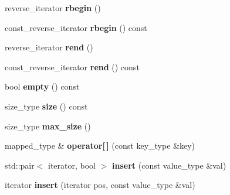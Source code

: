 \begin{DoxyCompactItemize}
\item 
\hypertarget{classLoki_1_1AssocVector_a88d59f808d500e505faa0fa7783ad69c}{}reverse\+\_\+iterator {\bfseries rbegin} ()\label{classLoki_1_1AssocVector_a88d59f808d500e505faa0fa7783ad69c}

\item 
\hypertarget{classLoki_1_1AssocVector_aa6fa6f8f8e9ccd042d1fef601029f252}{}const\+\_\+reverse\+\_\+iterator {\bfseries rbegin} () const \label{classLoki_1_1AssocVector_aa6fa6f8f8e9ccd042d1fef601029f252}

\item 
\hypertarget{classLoki_1_1AssocVector_a06a96998168c4774c80892ac28b3cf21}{}reverse\+\_\+iterator {\bfseries rend} ()\label{classLoki_1_1AssocVector_a06a96998168c4774c80892ac28b3cf21}

\item 
\hypertarget{classLoki_1_1AssocVector_a46222aaabc6de5041da1dbf07a40c3c0}{}const\+\_\+reverse\+\_\+iterator {\bfseries rend} () const \label{classLoki_1_1AssocVector_a46222aaabc6de5041da1dbf07a40c3c0}

\item 
\hypertarget{classLoki_1_1AssocVector_a7aff90b990beaff77a147eb2172f6290}{}bool {\bfseries empty} () const \label{classLoki_1_1AssocVector_a7aff90b990beaff77a147eb2172f6290}

\item 
\hypertarget{classLoki_1_1AssocVector_af2e4bd14f695360ba5afc01f64a5ce6b}{}size\+\_\+type {\bfseries size} () const \label{classLoki_1_1AssocVector_af2e4bd14f695360ba5afc01f64a5ce6b}

\item 
\hypertarget{classLoki_1_1AssocVector_aa349b331fdc3b1b1157820f880f8ca09}{}size\+\_\+type {\bfseries max\+\_\+size} ()\label{classLoki_1_1AssocVector_aa349b331fdc3b1b1157820f880f8ca09}

\item 
\hypertarget{classLoki_1_1AssocVector_ae69c5aad6d99d023dc31110b03b6bc89}{}mapped\+\_\+type \& {\bfseries operator\mbox{[}$\,$\mbox{]}} (const key\+\_\+type \&key)\label{classLoki_1_1AssocVector_ae69c5aad6d99d023dc31110b03b6bc89}

\item 
\hypertarget{classLoki_1_1AssocVector_aa1a55359c5376e49232febaace080aba}{}std\+::pair$<$ iterator, bool $>$ {\bfseries insert} (const value\+\_\+type \&val)\label{classLoki_1_1AssocVector_aa1a55359c5376e49232febaace080aba}

\item 
\hypertarget{classLoki_1_1AssocVector_ad4a561b4f05db204ea78fa777e5eb8a9}{}iterator {\bfseries insert} (iterator pos, const value\+\_\+type \&val)\label{classLoki_1_1AssocVector_ad4a561b4f05db204ea78fa777e5eb8a9}


\end{DoxyCompactItemize}

